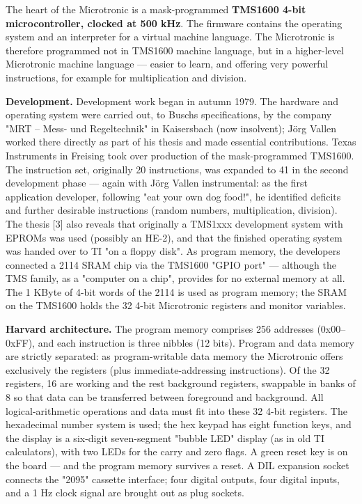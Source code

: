 \documentclass[
  11pt,
  letterpaper,
]{article}
\begin{document}
The heart of the Microtronic is a mask-programmed \textbf{TMS1600 4-bit
microcontroller, clocked at 500 kHz}. The firmware contains the
operating system and an interpreter for a virtual machine language. The
Microtronic is therefore programmed not in TMS1600 machine language, but
in a higher-level Microtronic machine language --- easier to learn, and
offering very powerful instructions, for example for multiplication and
division.

\textbf{Development.} Development work began in autumn 1979. The
hardware and operating system were carried out, to
Busch\textquotesingle s specifications, by the company "MRT -- Mess- und
Regeltechnik" in Kaisersbach (now insolvent); Jörg Vallen worked there
directly as part of his thesis and made essential contributions. Texas
Instruments in Freising took over production of the mask-programmed
TMS1600. The instruction set, originally 20 instructions, was expanded
to 41 in the second development phase --- again with Jörg Vallen
instrumental: as the first application developer, following "eat your
own dog food!", he identified deficits and further desirable
instructions (random numbers, multiplication, division). The thesis
{[}3{]} also reveals that originally a TMS1xxx development system with
EPROMs was used (possibly an HE-2), and that the finished operating
system was handed over to TI "on a floppy disk". As program memory, the
developers connected a 2114 SRAM chip via the TMS1600 "GPIO port" ---
although the TMS family, as a "computer on a chip", provides for no
external memory at all. The 1 KByte of 4-bit words of the 2114 is used
as program memory; the SRAM on the TMS1600 holds the 32 4-bit
Microtronic registers and monitor variables.

\textbf{Harvard architecture.} The program memory comprises 256
addresses (0x00--0xFF), and each instruction is three nibbles (12 bits).
Program and data memory are strictly separated: as program-writable data
memory the Microtronic offers exclusively the registers (plus
immediate-addressing instructions). Of the 32 registers, 16 are working
and the rest background registers, swappable in banks of 8 so that data
can be transferred between foreground and background. All
logical-arithmetic operations and data must fit into these 32 4-bit
registers. The hexadecimal number system is used; the hex keypad has
eight function keys, and the display is a six-digit seven-segment
"bubble LED" display (as in old TI calculators), with two LEDs for the
carry and zero flags. A green reset key is on the board --- and the
program memory survives a reset. A DIL expansion socket connects the
"2095" cassette interface; four digital outputs, four digital inputs,
and a 1 Hz clock signal are brought out as plug sockets.
\end{document}
